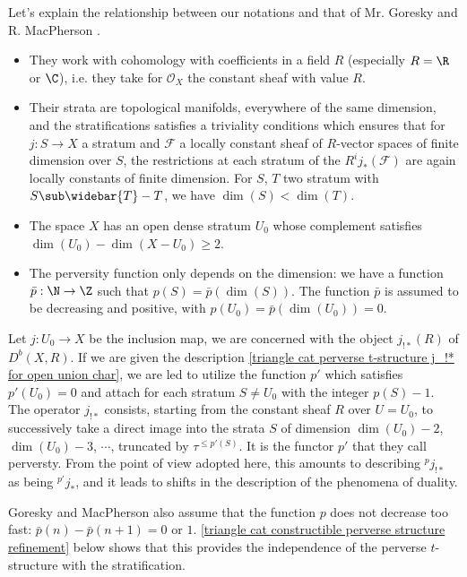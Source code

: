 \begin{remark}
Let's explain the relationship between our notations and that of Mr. Goresky and R. MacPherson \cite{*}.
\begin{itemize}
    \item They work with cohomology with coefficients in a field $R$ (especially $R=\R$ or $\C$), i.e. they take for $\mathscr{O}_X$ the constant sheaf with value $R$.
    \item Their strata are topological manifolds, everywhere of the same dimension, and the stratifications satisfies a triviality conditions which ensures that for $j:S\to X$ a stratum and $\mathscr{F}$ a locally constant sheaf of $R$-vector spaces of finite dimension over $S$, the restrictions at each stratum of the $R^ij_*(\mathscr{F})$ are again locally constants of finite dimension. For $S$, $T$ two stratum with $S\sub\widebar{T}-T$, we have $\dim(S)<\dim(T)$.
    \item The space $X$ has an open dense stratum $U_0$ whose complement satisfies $\dim(U_0)-\dim(X-U_0)\geq 2$.
    \item The perversity function only depends on the dimension: we have a function $\bar{p}:\N\to\Z$ such that $p(S)=\bar{p}(\dim(S))$. The function $\bar{p}$ is assumed to be decreasing and positive, with $p(U_0)=\bar{p}(\dim(U_0))=0$.
\end{itemize}
Let $j:U_0\to X$ be the inclusion map, we are concerned with the object $j_{!*}(R)$ of $D^b(X,R)$. If we are given the description \cref{triangle cat perverse t-structure j_!* for open union char}, we are led to utilize the function $p'$ which satisfies $p'(U_0)=0$ and attach for each stratum $S\neq U_0$ with the integer $p(S)-1$. The operator $j_{!*}$ consists, starting from the constant sheaf $R$ over $U=U_0$, to successively take a direct image into the strata $S$ of dimension $\dim(U_0)-2$, $\dim(U_0)-3$, $\cdots$, truncated by $\tau^{\leq p'(S)}$. It is the functor $p'$ that they call perversty. From the point of view adopted here, this amounts to describing ${^pj_{!*}}$ as being ${^{p'}j_*}$, and it leads to shifts in the description of the phenomena of duality.\par
Goresky and MacPherson also assume that the function $p$ does not decrease too fast: $\bar{p}(n)-\bar{p}(n+1)=0$ or $1$. \cref{triangle cat constructible perverse structure refinement} below shows that this provides the independence of the perverse $t$-structure with the stratification.
\end{remark}

